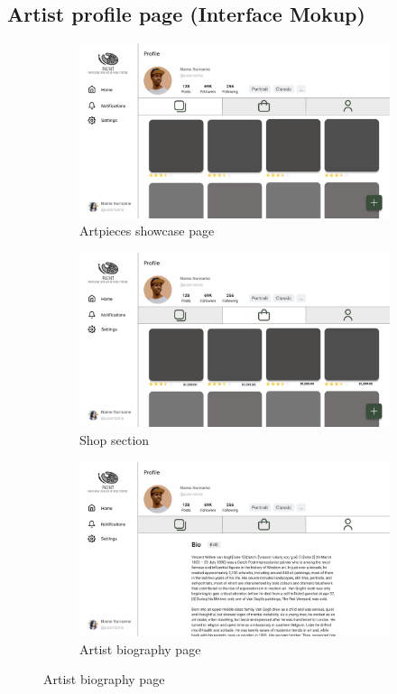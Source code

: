 \subsection{Artist profile page (Interface Mokup)}
\begin{figure}[H]
    \centering
\begin{subfigure}[b]{0.49\textwidth}
    \centering
    \includegraphics[width=\textwidth]{images/interface_mockups/Artist profile - showcase.pdf}
    \caption{Artpieces showcase page}
\end{subfigure}
\begin{subfigure}[b]{0.49\textwidth}
    \centering
    \includegraphics[width=\textwidth]{images/interface_mockups/Artist profile - shop.pdf}
    \caption{Shop section}
\end{subfigure}
\begin{subfigure}[b]{0.49\textwidth}
    \centering
    \includegraphics[width=\textwidth]{images/interface_mockups/Artist profile - bio.pdf}
    \caption{Artist biography page}
\end{subfigure}
\end{figure}


